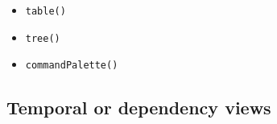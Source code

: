 \begin{itemize}
  \begin{itemize}
  \tightlist
  \item
    \texttt{t\allowbreak{}a\allowbreak{}b\allowbreak{}l\allowbreak{}e\allowbreak{}(\allowbreak{})}
  \item
    \texttt{t\allowbreak{}r\allowbreak{}e\allowbreak{}e\allowbreak{}(\allowbreak{})}
  \item
    \texttt{c\allowbreak{}o\allowbreak{}m\allowbreak{}m\allowbreak{}a\allowbreak{}n\allowbreak{}d\allowbreak{}P\allowbreak{}a\allowbreak{}l\allowbreak{}e\allowbreak{}t\allowbreak{}t\allowbreak{}e\allowbreak{}(\allowbreak{})}
  \end{itemize}
\end{itemize}

\subsection{Temporal or dependency views}\label{record-019-temporal-or-dependency-views}

